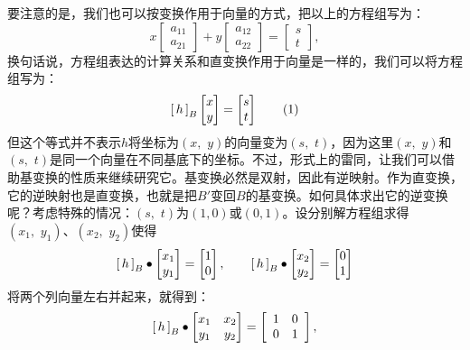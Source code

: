 \documentclass[12pt,UTF8,fontset=none]{ctexbook}
\begin{document}
要注意的是，我们也可以按变换作用于向量的方式，把以上的方程组写为：
$$ x\begin{bmatrix}
    a_{11}\\ a_{21} 
\end{bmatrix} + y \begin{bmatrix}
    a_{12}\\ a_{22}
\end{bmatrix} = \begin{bmatrix}
    s \\ t
\end{bmatrix},
$$
换句话说，方程组表达的计算关系和直变换作用于向量是一样的，我们可以将方程组写为：
\begin{equation*}
\bmat{h}[B] \begin{bmatrix}
    x\\y
\end{bmatrix}=\begin{bmatrix}
    s\\t
\end{bmatrix}\tag{1}
\end{equation*}
但这个等式并不表示$h$将坐标为$(x,\,\,y)$的向量变为$(s,\,\,t)$，因为这里$(x,\,\,y)$和$(s,\,\,t)$是同一个向量在不同基底下的坐标。不过，形式上的雷同，让我们可以借助基变换的性质来继续研究它。基变换必然是双射，因此有逆映射。作为直变换，它的逆映射也是直变换，也就是把$B'$变回$B$的基变换。如何具体求出它的逆变换呢？考虑特殊的情况：$(s,\,\,t)$为$(1,0)$或$(0,1)$。设分别解方程组求得$(x_1,\,\,y_1)$、$(x_2,\,\,y_2)$使得
$$
\bmat{h}[B]\bullet \begin{bmatrix}
    x_1\\y_1
\end{bmatrix}=\begin{bmatrix}
    1\\0
\end{bmatrix},\qquad
\bmat{h}[B]\bullet \begin{bmatrix}
    x_2\\y_2
\end{bmatrix}=\begin{bmatrix}
    0\\1
\end{bmatrix}
$$
将两个列向量左右并起来，就得到：
$$
\bmat{h}[B]\bullet \begin{bmatrix}
    x_1&x_2\\y_1&y_2
\end{bmatrix}=\begin{bmatrix}
    \phantom{0}1&0\phantom{0}\\\phantom{0}0&1\phantom{0}
\end{bmatrix},
$$
\end{document}
